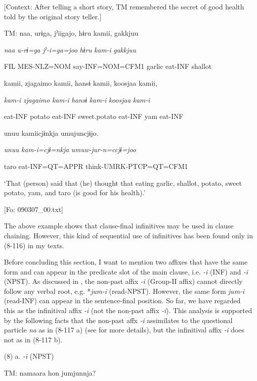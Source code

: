   [Context: After telling a short story, TM remembered the secret of good health told by the original story teller.]

  TM:  naa,  urɨga,  jˀiigajo,  hɨru  kamii,  gakkjuu

    \textit{naa}  \textit{u-rɨ=ga}  \textit{jˀ-i=ga=joo}  \textit{hɨru}  \textit{kam-i}  \textit{gakkjuu}

    FIL  MES-NLZ=NOM  say-INF=NOM=CFM1  garlic  eat-INF  shallot

    kamii,  {\textbar}zjagaimo{\textbar}  kamii,  hansɨ  kamii,  koosjaa  kamii,

    \textit{kam-i}  \textit{zjagaimo}  \textit{kam-i}  \textit{hansɨ}  \textit{kam-i}  \textit{koosjaa}  \textit{kam-i}

    eat-INF  potato  eat-INF  sweet.potato  eat-INF  yam  eat-INF

    unuu  kamiicjɨnkja  umujuncjɨjo.

    \textit{unuu}  \textit{kam-i=cjɨ=nkja}  \textit{umuw-jur-n=ccjɨ=joo}

    taro  eat-INF=QT=APPR  think-UMRK-PTCP=QT=CFM1

    ‘That (person) said that (he) thought that eating garlic, shallot, potato, sweet potato, yam, and taro (is good for his health).’

    [Fo: 090307\_00.txt]

The above example shows that clause-final infinitives may be used in clause chaining. However, this kind of sequential use of infinitives has been found only in (8-116) in my texts.

Before concluding this section, I want to mention two affixes that have the same form and can appear in the predicate slot of the main clause, i.e. \textit{{}-i} (INF) and \textit{{}-i} (NPST). As discussed in , the non-past affix \textit{{}-i} (Group-II affix) cannot directly follow any verbal root, e.g. *\textit{jum-i} (read-NPST). However, the same form \textit{jum-i} (read-INF) can appear in the sentence-final position. So far, we have regarded this as the infinitival affix \textit{{}-i} (not the non-past affix \textit{{}-i}). This analysis is supported by the following facts that the non-past affx \textit{{}-i} assimilates to the questional particle \textit{na} as in (8-117 a) (see  for more details), but the infinitival affix \textit{{}-i} does not as in (8-117 b).

(8)  a.  \textit{{}-i} (NPST)

    TM:  namaara  hon  jumjunnja?

